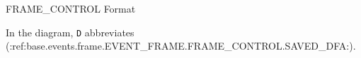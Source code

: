 \begin{BedrockListedFormatDiagram}{FRAME\_CONTROL Format}
\end{BedrockListedFormatDiagram}
{\small In the diagram, \texttt{D} abbreviates (:ref:base.events.frame.EVENT_FRAME.FRAME_CONTROL.SAVED_DFA:).\par}
